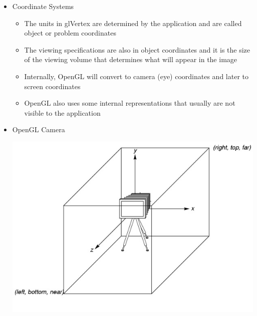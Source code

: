 \documentclass[11pt,a4paper]{article}
\begin{document}
\begin{itemize}
			\item Coordinate Systems
				\begin{itemize}
					\item The units in glVertex are determined by the application and are called object or problem coordinates	
					\item The viewing specifications are also in object	coordinates and it is the size of the viewing volume that determines what will appear in the image	
					\item Internally, OpenGL will convert to camera (eye) coordinates and later to screen coordinates 	
					\item OpenGL also uses some internal representations that usually are not visible to the application
				\end{itemize}
			\item OpenGL Camera 


			\begin{center}
				\includegraphics[scale=0.5]{pictures/OpenGLCamera.jpg}
			\end{center}


\end{itemize}
\end{document}
